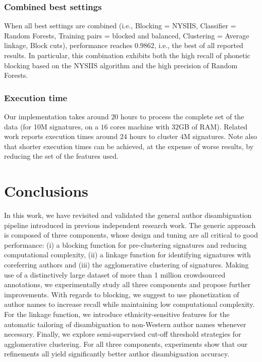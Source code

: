 \documentclass[runningheads,a4paper]{llncs}
\makeatletter
\newcommand*{\ie}{i.e.\@\xspace}
\newcommand{\longpage}{\enlargethispage{\baselineskip}}
\makeatother
\begin{document}
\subsubsection{Combined best settings} When all best settings are combined (\ie, Blocking = NYSIIS, Classifier = Random Forests, Training
pairs = blocked and balanced, Clustering = Average linkage, Block cuts),
performance reaches $0.9862$, \ie, the best of all reported results. In particular,
this combination exhibits both the high recall of phonetic blocking based on the NYSIIS algorithm and the high precision of Random Forests.

\subsubsection{Execution time} Our implementation takes around $20$ hours to process the complete set of the data (for 10M signatures, on a $16$ cores machine with $32$GB of RAM). Related work \cite{khabsa2014large} reports execution times around $24$ hours to cluster $4$M signatures. Note also that shorter execution times can be achieved, at the expense of worse results, by reducing the set of the features used.



\section{Conclusions}
\label{conclusions}

\longpage

In this work, we have revisited and validated the general author disambiguation
pipeline introduced in previous independent research work.
The generic approach is composed of three components, whose design and tuning are all critical
to good performance: (i) a blocking function for pre-clustering signatures
and reducing computational complexity, (ii) a linkage function for identifying
signatures with coreferring authors and (iii) the agglomerative clustering of
signatures. Making use of a distinctively large dataset of more than 1 million
crowdsourced annotations, we experimentally study all three components and
propose further improvements. With regards to blocking, we suggest to use
phonetization of author names to increase recall while maintaining low
computational complexity. For the linkage function, we introduce
ethnicity-sensitive features for the automatic tailoring of disambiguation to non-Western
author names whenever necessary. Finally, we explore semi-supervised cut-off
threshold strategies for agglomerative clustering. For all three components,
experiments show that our refinements all yield significantly better author
disambiguation accuracy.
\end{document}
